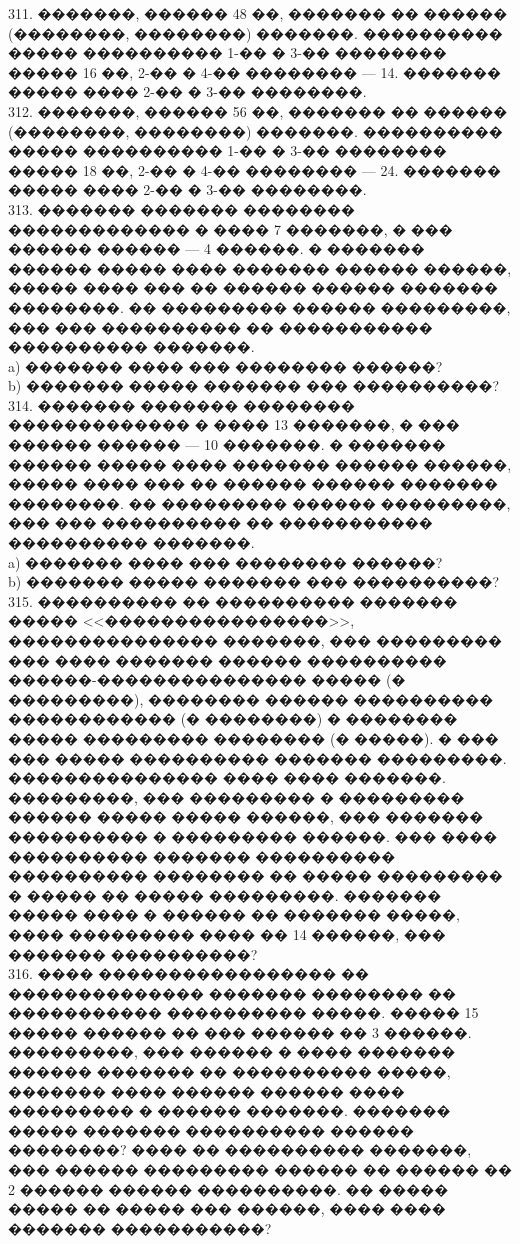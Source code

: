 \documentclass[12pt]{article}
\begin{document}
311. �������, ������ 48 ��, ������� �� ������ (��������, ��������) �������. ���������� ����� ���������� 1-�� � 3-�� �������� ����� 16 ��, 2-�� � 4-�� �������� --- 14. ������� ����� ���� 2-�� � 3-�� ��������.\\
312. �������, ������ 56 ��, ������� �� ������ (��������, ��������) �������. ���������� ����� ���������� 1-�� � 3-�� �������� ����� 18 ��, 2-�� � 4-�� �������� --- 24. ������� ����� ���� 2-�� � 3-�� ��������.\\
313. ������� ������� �������� ������������� � ���� 7 �������, � ��� ������ ������ --- 4 ������. � ������� ������ ����� ���� ������� ������ ������, ����� ���� ��� �� ������ ������ ������� ��������. �� ��������� ������ ���������, ��� ��� ���������� �� ����������� ���������� �������.\\
a) ������� ���� ��� �������� ������?\\
b) ������� ����� ������� ��� ����������?\\
314. ������� ������� �������� ������������� � ���� 13 �������, � ��� ������ ������ --- 10 �������. � ������� ������ ����� ���� ������� ������ ������, ����� ���� ��� �� ������ ������ ������� ��������. �� ��������� ������ ���������, ��� ��� ���������� �� ����������� ���������� �������.\\
a) ������� ���� ��� �������� ������?\\
b) ������� ����� ������� ��� ����������?\\
315. ���������� �� ���������� ������� ����� <<����������������>>, ��������������� �������, ��� ��������� ��� ���� ������� ������ ���������� ������-��������������� ����� (� ���������), �������� ������ ���������� ������������ (� ��������) � �������� ����� ��������� �������� (� �����). � ��� ��� ����� ���������� ������� ���������. ��������������� ���� ���� �������. ���������, ��� ��������� � ��������� ������ ����� ����� ������, ��� ������� ���������� � ��������� ������. ��� ���� ���������� ������� ���������� ���������� �������� �� ����� ��������� � ����� �� ����� ���������. ������� ����� ���� � ������ �� ������� �����, ���� ��������� ���� �� 14 ������, ��� ������� ����������?\\
316. ���� ����������������� �� �������������� ������� �������� �� ����������� ���������� �����. ����� 15 ����� ������ �� ��� ������ �� 3 ������. ���������, ��� ������ � ���� ������� ������ ������� �� ���������� �����, ������� ���� ������ ������ ���� ��������� � ������ �������. ������� ����� ������� ���������� ������ ��������? ���� �� ���������� �������, ��� ������ ��������� ������ �� ������ �� 2 ������ ������ ����������. �� ����� ����� �� ����� ��� ������, ���� ���� ������� �����������?\\
\end{document}
